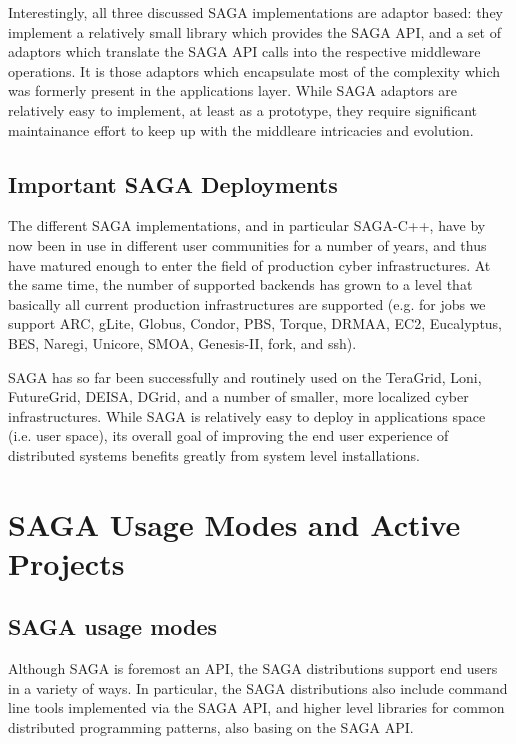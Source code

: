\documentclass[12pt]{article}
\begin{document}
  Interestingly, all three discussed SAGA implementations are adaptor
  based: they implement a relatively small library which provides the
  SAGA API, and a set of adaptors which translate the SAGA API calls
  into the respective middleware operations.  It is those adaptors
  which encapsulate most of the complexity which was formerly present
  in the applications layer.  While SAGA adaptors are relatively easy
  to implement, at least as a prototype, they require significant
  maintainance effort to keep up with the middleare intricacies and
  evolution.



 \subsection{Important SAGA Deployments}

  The different SAGA implementations, and in particular SAGA-C++, have
  by now been in use in different user communities for a number of
  years, and thus have matured enough to enter the  field of
  production cyber infrastructures.  At the same time, the number of
  supported backends has grown to a level that basically all current
  production infrastructures are supported (e.g. for jobs we support
  ARC, gLite, Globus, Condor, PBS, Torque, DRMAA, EC2, Eucalyptus,
  BES,  Naregi, Unicore, SMOA, Genesis-II, fork, and ssh).  

  SAGA has so far been successfully and routinely used on the
  TeraGrid, Loni, FutureGrid, DEISA, DGrid, and a number of smaller,
  more localized cyber infrastructures.  While SAGA is relatively easy
  to deploy in applications space (i.e. user space), its overall goal
  of improving the end user experience of distributed systems benefits
  greatly from system level installations.



\section{SAGA Usage Modes and Active Projects}

\subsection{SAGA usage modes}

  Although SAGA is foremost an API, the SAGA distributions support end
  users in a variety of ways.  In particular, the SAGA distributions
  also include command line tools implemented via the SAGA API, and
  higher level libraries for common distributed programming patterns,
  also basing on the SAGA API. 
\end{document}
